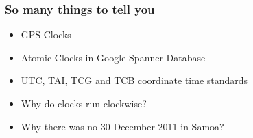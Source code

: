 \documentclass[aspectratio=169, 15pt,usenames,dvipsnames]{beamer}
\begin{document}
	\begin{gdblank}
		\frametitle{So many things to tell you}
		\large
		\begin{itemize}
			\item GPS Clocks
			\item Atomic Clocks in Google Spanner Database
			\item UTC, TAI, TCG and TCB coordinate time standards
			\pause
			\item Why do clocks run clockwise?
			\item Why there was no 30 December 2011 in Samoa?
		\end{itemize}
	\end{gdblank} 
	\begin{gdthankyou}	
	\end{gdthankyou}
\end{document}
